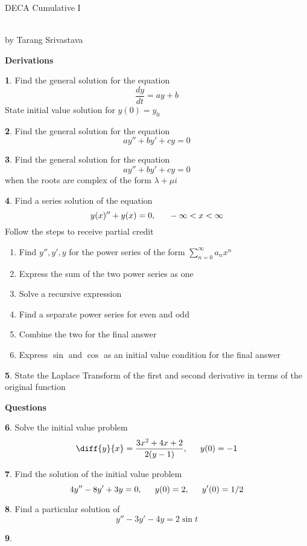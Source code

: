 \documentclass[11pt]{article}
\author{Tarang Srivastava}
\newcommand{\makechaptertitle}[1]{
\begin{center}
	\begin{large}
		DECA Cumulative I
	\end{large}
	\begin{small}
		\\by Tarang Srivastava
	\end{small}
\end{center}
}
\theoremstyle{definition}
\newtheorem{q}{}
\begin{document}
	\begin{multicols*}{2}
		\makechaptertitle{}
		
		\textbf{Derivations}
		\begin{q}
			Find the general solution for the equation \[ \dfrac{dy}{dt} = ay + b\]
			State initial value solution for $ y(0) = y_0 $
		\end{q}
		\begin{q}
			Find the general solution for the equation \[ ay'' + by' + cy = 0 \]
		\end{q}
		\begin{q}
			Find the general solution for the equation \[ ay'' + by' + cy = 0 \] when the roots are complex of the form $ 
			\lambda + \mu i $
		\end{q}
		\begin{q}
			Find a series solution of the equation \[ y(x)'' + y(x) = 0, \indent -\infty < x < \infty \] Follow the steps to receive partial credit
			\begin{enumerate}
				\item Find $ y'', y', y $ for the power series of the form $ \sum \limits_{n=0}^\infty a_nx^n$
				\item Express the sum of the two power series as one 
				\item Solve a recursive expression
				\item Find a separate power series for even and odd
				\item Combine the two for the final answer
				\item Express $ \sin $ and $ \cos $ as an initial value condition for the final answer
			\end{enumerate}
		\end{q}
		\begin{q}
			State the Laplace Transform of the first and second derivative in terms of the original function 
		\end{q}
		\textbf{Questions}
		\begin{q}
			Solve the initial value problem \[ \diff{y}{x} = \frac{3x^2+4x+2}{2(y-1)}, \indent y(0) = -1  \]
		\end{q}
		\begin{q}
			Find the solution of the initial value problem \[  4y'' - 8y' + 3y = 0, \indent y(0) = 2, \indent y'(0) = 1/2   \]
		\end{q}
		\begin{q}
			Find a particular solution of \[ y'' - 3y' - 4y = 2 \sin t \]
		\end{q}
		\begin{q}

\end{q}
\end{multicols*}
\end{document}
